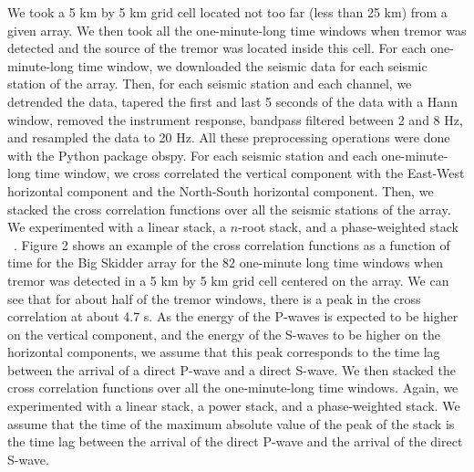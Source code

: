 \documentclass[draft]{agujournal2019}
\begin{document}
We took a 5 km by 5 km grid cell located not too far (less than 25 km) from a given array. We then took all the one-minute-long time windows when tremor was detected and the source of the tremor was located inside this cell. For each one-minute-long time window, we downloaded the seismic data for each seismic station of the array. Then, for each seismic station and each channel, we detrended the data, tapered the first and last 5 seconds of the data with a Hann window, removed the instrument response, bandpass filtered between 2 and 8 Hz, and resampled the data to 20 Hz. All these preprocessing operations were done with the Python package obspy. For each seismic station and each one-minute-long time window, we cross correlated the vertical component with the East-West horizontal component and the North-South horizontal component. Then, we stacked the cross correlation functions over all the seismic stations of the array. We experimented with a linear stack, a $n$-root stack, and a phase-weighted stack ~\cite{SCH_1997}. Figure 2 shows an example of the cross correlation functions as a function of time for the Big Skidder array for the 82 one-minute long time windows when tremor was detected in a 5 km by 5 km grid cell centered on the array. We can see that for about half of the tremor windows, there is a peak in the cross correlation at about 4.7 s. As the energy of the P-waves is expected to be higher on the vertical component, and the energy of the S-waves to be higher on the horizontal components, we assume that this peak corresponds to the time lag between the arrival of a direct P-wave and a direct S-wave. We then stacked the cross correlation functions over all the one-minute-long time windows. Again, we experimented with a linear stack, a power stack, and a phase-weighted stack. We assume that the time of the maximum absolute value of the peak of the stack is the time lag between the arrival of the direct P-wave and the arrival of the direct S-wave. 
\end{document}
